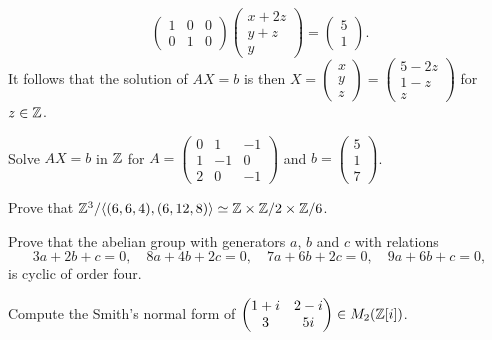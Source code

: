 \begin{example}
\[\begin{pmatrix}
		1 & 0 & 0\\
		0 & 1 & 0
	\end{pmatrix}\begin{pmatrix}
		x+2z\\
		y+z\\
		y
	\end{pmatrix}
	=\begin{pmatrix}
		5\\
		1
	\end{pmatrix}.
	\]
	It follows that the solution of $AX=b$ is then $X=\begin{pmatrix}
		x\\
		y\\
		z
	\end{pmatrix}
	=\begin{pmatrix}
		5-2z\\
		1-z\\
		z
	\end{pmatrix}$ for $z\in\mathbb{Z}$. 
\end{example}

\begin{exercise}
	\label{xca:AX=b}
	Solve $AX=b$ in $\mathbb{Z}$ for $A=\begin{pmatrix}
		0 & 1 & -1\\
		1 & -1 & 0\\
		2 & 0 & -1
	\end{pmatrix}$ and $b=\begin{pmatrix}
		5\\
		1\\
		7
	\end{pmatrix}$. 
\end{exercise}

\begin{exercise}
	\label{xca:factors_260}
	Prove that $\mathbb{Z}^3/\langle
	(6,6,4),(6,12,8)\rangle\simeq\mathbb{Z}\times\mathbb{Z}/2\times\mathbb{Z}/6$.
\end{exercise}

\begin{exercise}
\label{xca:C4}
    Prove that the abelian group with generators 
    $a$, $b$ and $c$ with relations
    \[
    3a+2b+c=0,
    \quad
    8a+4b+2c=0,
    \quad
    7a+6b+2c=0,
    \quad
    9a+6b+c=0,
    \]
    is cyclic of order four.
\end{exercise}

\begin{exercise}
	\label{xca:Smith_Z[i]}
	Compute the Smith's normal 
	form of 
	$\begin{pmatrix}
		1+i & 2-i\\
		3 & 5i
	\end{pmatrix}\in M_2(\mathbb{Z}[i])$. 
\end{exercise}

